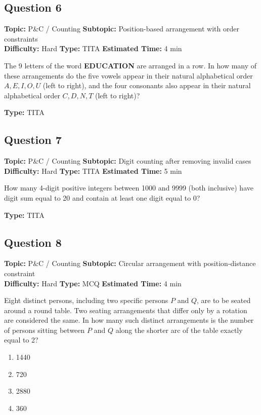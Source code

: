 \documentclass[11pt,a4paper]{article}
\begin{document}
\subsection*{Question 6}
\textbf{Topic:} P\&C / Counting \quad
\textbf{Subtopic:} Position-based arrangement with order constraints \\
\textbf{Difficulty:} Hard \quad
\textbf{Type:} TITA \quad
\textbf{Estimated Time:} 4 min
\begin{tcolorbox}[qbox]
The 9 letters of the word \textbf{EDUCATION} are arranged in a row. In how many of these arrangements do the five vowels appear in their natural alphabetical order \(A, E, I, O, U\) (left to right), and the four consonants also appear in their natural alphabetical order \(C, D, N, T\) (left to right)?
\end{tcolorbox}
\textbf{Type:} TITA

\subsection*{Question 7}
\textbf{Topic:} P\&C / Counting \quad
\textbf{Subtopic:} Digit counting after removing invalid cases \\
\textbf{Difficulty:} Hard \quad
\textbf{Type:} TITA \quad
\textbf{Estimated Time:} 5 min
\begin{tcolorbox}[qbox]
How many 4-digit positive integers between 1000 and 9999 (both inclusive) have digit sum equal to 20 and contain at least one digit equal to 0?
\end{tcolorbox}
\textbf{Type:} TITA

\subsection*{Question 8}
\textbf{Topic:} P\&C / Counting \quad
\textbf{Subtopic:} Circular arrangement with position-distance constraint \\
\textbf{Difficulty:} Hard \quad
\textbf{Type:} MCQ \quad
\textbf{Estimated Time:} 4 min
\begin{tcolorbox}[qbox]
Eight distinct persons, including two specific persons \(P\) and \(Q\), are to be seated around a round table. Two seating arrangements that differ only by a rotation are considered the same. In how many such distinct arrangements is the number of persons sitting between \(P\) and \(Q\) along the shorter arc of the table exactly equal to 2?
\end{tcolorbox}
\begin{enumerate}[label=(\Alph*)]
\item 1440
\item 720
\item 2880
\item 360
\end{enumerate}
\end{document}

